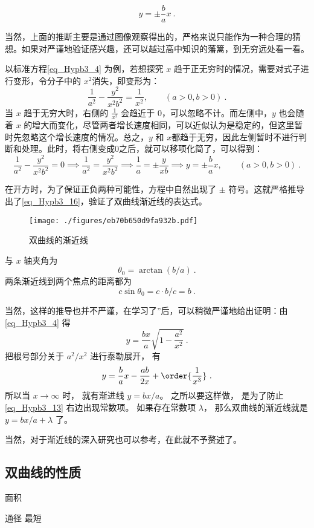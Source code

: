 \begin{equation}\label{eq_Hypb3_16}
y=\pm\frac{b}{a}x~.
\end{equation}

当然，上面的推断主要是通过图像观察得出的，严格来说只能作为一种合理的猜想。如果对严谨地验证感兴趣，还可以越过高中知识的藩篱，到无穷远处看一看。

以标准方程\autoref{eq_Hypb3_4} 为例，若想探究 $x$ 趋于正无穷时的情况，需要对式子进行变形，令分子中的 $x^2$消失，即变形为：
\begin{equation}
\frac{1}{a^2} - \frac{y^2}{x^2b^2} =  \frac{1}{x^2} ,\qquad(a>0,b>0)~.
\end{equation}
当 $x$ 趋于无穷大时，右侧的 $\frac{1}{x^2}$ 会趋近于 $0$，可以忽略不计。而左侧中，$y$ 也会随着 $x$ 的增大而变化，尽管两者增长速度相同，可以近似认为是稳定的，但这里暂时先忽略这个增长速度的情况。总之，$y$ 和 $x$都趋于无穷，因此左侧暂时不进行判断和处理。此时，将右侧变成$0$之后，就可以移项化简了，可以得到：
\begin{equation}
\frac{1}{a^2} - \frac{y^2}{x^2b^2} = 0 \implies\frac{1}{a^2} = \frac{y^2}{x^2b^2}\implies \frac{1}{a} = \pm\frac{y}{xb}\implies y=\pm\frac{b}{a}x,\qquad(a>0,b>0)~.
\end{equation}

在开方时，为了保证正负两种可能性，方程中自然出现了 $\pm$ 符号。这就严格推导出了\autoref{eq_Hypb3_16}，验证了双曲线渐近线的表达式。

\begin{figure}[ht]
\centering
\texttt{[image: ./figures/eb70b650d9fa932b.pdf]}
\caption{双曲线的渐近线} \label{fig_Hypb3_1}
\end{figure}

与 $x$ 轴夹角为
\begin{equation}\label{eq_Hypb3_1}
\theta_0 = \arctan(b/a)~.
\end{equation}
两条渐近线到两个焦点的距离都为
\begin{equation}\label{eq_Hypb3_11}
c\sin\theta_0 = c\cdot b/c = b~.
\end{equation}

当然，这样的推导也并不严谨，在学习了”后，可以稍微严谨地给出证明：由\autoref{eq_Hypb3_4} 得
\begin{equation}
y = \frac{bx}{a} \sqrt{1-\frac{a^2}{x^2}}~.
\end{equation}
把根号部分关于 $a^2/x^2$ 进行泰勒展开， 有
\begin{equation}\label{eq_Hypb3_13}
y = \frac ba x - \frac{ab}{2x} + \order{\frac{1}{x^3}}~.
\end{equation}
所以当 $x\to\infty$ 时， 就有渐进线 $y = bx/a$。 之所以要这样做， 是为了防止\autoref{eq_Hypb3_13} 右边出现常数项。 如果存在常数项 $\lambda$， 那么双曲线的渐近线就是 $y = bx/a + \lambda$ 了。


当然，对于渐近线的深入研究也可以参考，在此就不予赘述了。

\subsection{双曲线的性质}
面积

通径
最短
